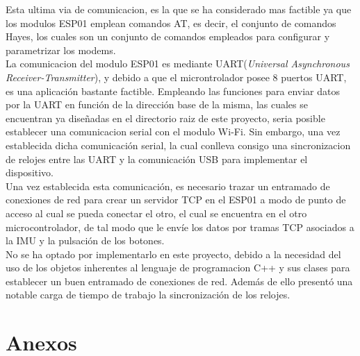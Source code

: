 \documentclass[a4paper,twoside]{article}
\begin{document}
Esta ultima via de comunicacion, es la que se ha considerado mas factible ya que los modulos ESP01 emplean comandos AT, es decir, el conjunto de comandos Hayes, los cuales son un conjunto de comandos empleados para configurar y parametrizar los modems. \\
La comunicacion del modulo ESP01 es mediante UART(\textit{Universal Asynchronous Receiver-Transmitter}), y debido a que el microntrolador posee 8 puertos UART, es una aplicación bastante factible. Empleando las funciones para enviar datos por la UART en función de la dirección base de la misma, las cuales se encuentran ya diseñadas en el directorio raiz de este proyecto, seria posible establecer una comunicacion serial con el modulo Wi-Fi. Sin embargo, una vez establecida dicha comunicación serial, la cual conlleva consigo una sincronizacion de relojes entre las UART y la comunicación USB para implementar el dispositivo. \\
Una vez establecida esta comunicación, es necesario trazar un entramado de conexiones de red para crear un servidor TCP en el ESP01 a modo de punto de acceso al cual se pueda conectar el otro, el cual se encuentra en el otro microcontrolador, de tal modo que le envíe los datos por tramas TCP asociados a la IMU y la pulsación de los botones.\\

No se ha optado por implementarlo en este proyecto, debido a la necesidad del uso de los objetos inherentes al lenguaje de programacion C++ y sus clases para establecer un buen entramado de conexiones de red. Además de ello presentó una notable carga de tiempo de trabajo la sincronización de los relojes. \\

\newpage

\section{Anexos}

\begin{lstlisting}[language=C,style=CStyle, caption={Declaración e inicialización de variables}]

\end{lstlisting}
\end{document}
